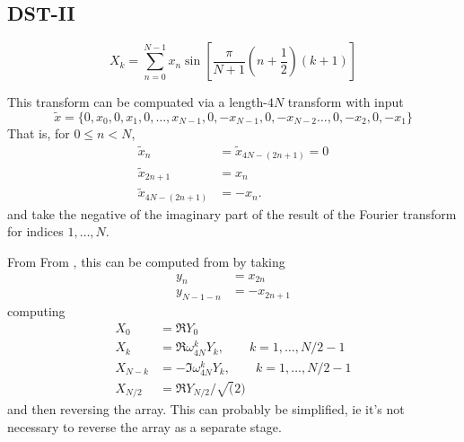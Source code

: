 \documentclass[12pt]{article}
\renewcommand{\(}{\left(}
\renewcommand{\)}{\right)}
\begin{document}
\subsection{DST-II}

\begin{dmath}
  X_k = \sum_{n=0}^{N-1}x_n \sin\left[\frac{\pi}{N+1}\(n+\frac{1}{2}\)(k+1)\right]
\end{dmath}

This transform can be compuated via a length-$4N$ transform with input
\begin{dmath}
  \tilde{x} = \{0, x_0, 0, x_1, 0, \dots, x_{N-1} ,0,  -x_{N-1}, 0, -x_{N-2}\dots , 0,  -x_2, 0, -x_1 \}
\end{dmath}
That is, for $0\leq n < N$,
\begin{eqnarray}
  \tilde{x}_n &= \tilde{x}_{4N - (2n +1)} = 0 \\
  \tilde{x}_{2n + 1} &= x_n \\
  \tilde{x}_{4N - (2n + 1)} &= -x_n.
\end{eqnarray}
and take the negative of the imaginary part of the result of the
Fourier transform for indices $1,\dots,N$.

From From \cite{shaojohnsondst23}, this can be computed from by taking
\begin{align}
  y_n &= x_{2 n} \\
  y_{N - 1 -n} &= -x_{2 n + 1}
\end{align}
computing
\begin{align}
  X_{0} &= \Re{Y_0} \\
  X_{k} &= \Re{\omega_{4N}^k Y_k}, \qquad k = 1,\dots, N/2-1 \\
  X_{N-k} &= -\Im{\omega_{4N}^k Y_k}, \qquad k = 1,\dots, N/2-1 \\
  X_{N / 2} &= \Re{Y_{N/2}}/\sqrt(2)
\end{align}
and then reversing the array.  This can probably be simplified, ie
it's not necessary to reverse the array as a separate stage.

\end{document}
